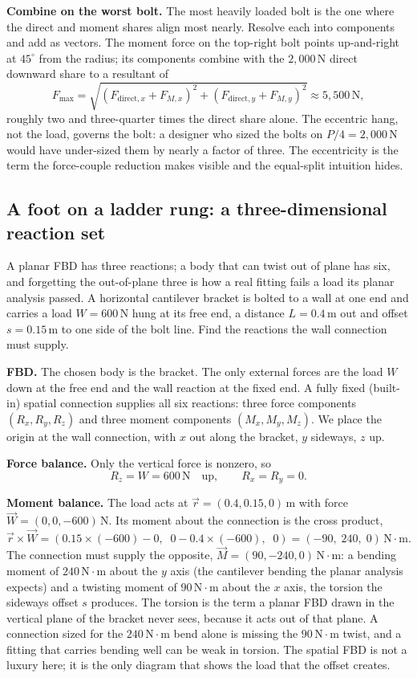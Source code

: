 \textbf{Combine on the worst bolt.} The most heavily loaded bolt is the one
where the direct and moment shares align most nearly. Resolve each into
components and add as vectors. The moment force on the top-right bolt points
up-and-right at $45^{\circ}$ from the radius; its components combine with
the $2{,}000\,\text{N}$ direct downward share to a resultant of
\[
F_{\max} = \sqrt{(F_{\text{direct},x} + F_{M,x})^2
+ (F_{\text{direct},y} + F_{M,y})^2} \approx 5{,}500\,\text{N},
\]
roughly two and three-quarter times the direct share alone. The eccentric
hang, not the load, governs the bolt: a designer who sized the bolts on
$P/4 = 2{,}000\,\text{N}$ would have under-sized them by nearly a factor of
three. The eccentricity is the term the force-couple reduction makes
visible and the equal-split intuition hides.

\subsection{A foot on a ladder rung: a three-dimensional reaction set}

A planar FBD has three reactions; a body that can twist out of plane has
six, and forgetting the out-of-plane three is how a real fitting fails a
load its planar analysis passed. A horizontal cantilever bracket is bolted
to a wall at one end and carries a load $W = 600\,\text{N}$ hung at its free
end, a distance $L = 0.4\,\si{\meter}$ out and offset $s = 0.15\,\si{\meter}$
to one side of the bolt line. Find the reactions the wall connection must
supply.

\textbf{FBD.} The chosen body is the bracket. The only external forces are
the load $W$ down at the free end and the wall reaction at the fixed end.
A fully fixed (built-in) spatial connection supplies all six reactions:
three force components $(R_x, R_y, R_z)$ and three moment components
$(M_x, M_y, M_z)$. We place the origin at the wall connection, with $x$ out
along the bracket, $y$ sideways, $z$ up.

\textbf{Force balance.} Only the vertical force is nonzero, so
\[
R_z = W = 600\,\text{N} \quad\text{up}, \qquad R_x = R_y = 0.
\]

\textbf{Moment balance.} The load acts at $\vec{r} = (0.4, 0.15, 0)\,
\si{\meter}$ with force $\vec{W} = (0, 0, -600)\,\text{N}$. Its moment about
the connection is the cross product,
\[
\vec{r}\times\vec{W}
= (0.15\times(-600) - 0,\;\; 0 - 0.4\times(-600),\;\; 0)
= (-90,\; 240,\; 0)\,\text{N}\cdot\text{m}.
\]
The connection must supply the opposite, $\vec{M} = (90, -240, 0)\,
\text{N}\cdot\text{m}$: a bending moment of $240\,\text{N}\cdot\text{m}$
about the $y$ axis (the cantilever bending the planar analysis expects) and
a twisting moment of $90\,\text{N}\cdot\text{m}$ about the $x$ axis, the
torsion the sideways offset $s$ produces. The torsion is the term a planar
FBD drawn in the vertical plane of the bracket never sees, because it acts
out of that plane. A connection sized for the $240\,\text{N}\cdot\text{m}$
bend alone is missing the $90\,\text{N}\cdot\text{m}$ twist, and a fitting
that carries bending well can be weak in torsion. The spatial FBD is not a
luxury here; it is the only diagram that shows the load that the offset
creates.

